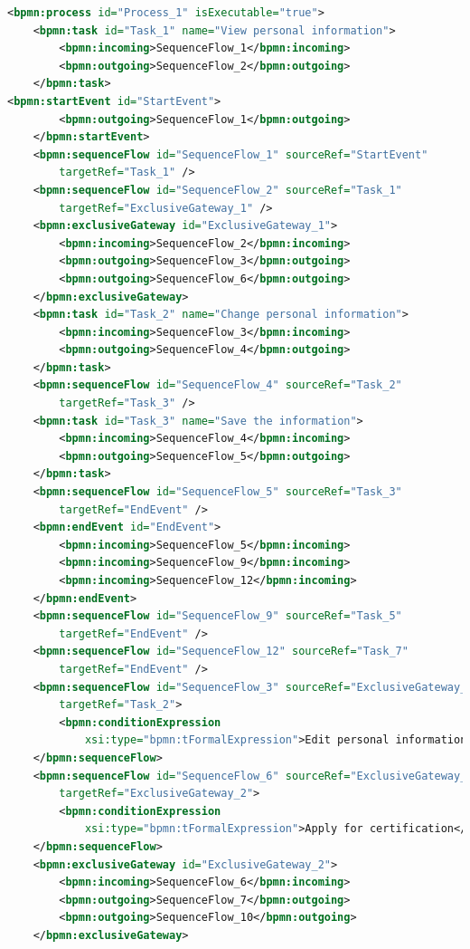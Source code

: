 \documentclass[runningheads]{llncs}
\begin{document}
   \begin{lstlisting}[language={XML}]
   <bpmn:process id="Process_1" isExecutable="true">
    <bpmn:task id="Task_1" name="View personal information">
        <bpmn:incoming>SequenceFlow_1</bpmn:incoming>
        <bpmn:outgoing>SequenceFlow_2</bpmn:outgoing>
    </bpmn:task>
<bpmn:startEvent id="StartEvent">
        <bpmn:outgoing>SequenceFlow_1</bpmn:outgoing>
    </bpmn:startEvent>
    <bpmn:sequenceFlow id="SequenceFlow_1" sourceRef="StartEvent"
        targetRef="Task_1" />
    <bpmn:sequenceFlow id="SequenceFlow_2" sourceRef="Task_1"
        targetRef="ExclusiveGateway_1" />
    <bpmn:exclusiveGateway id="ExclusiveGateway_1">
        <bpmn:incoming>SequenceFlow_2</bpmn:incoming>
        <bpmn:outgoing>SequenceFlow_3</bpmn:outgoing>
        <bpmn:outgoing>SequenceFlow_6</bpmn:outgoing>
    </bpmn:exclusiveGateway>
    <bpmn:task id="Task_2" name="Change personal information">
        <bpmn:incoming>SequenceFlow_3</bpmn:incoming>
        <bpmn:outgoing>SequenceFlow_4</bpmn:outgoing>
    </bpmn:task>
    <bpmn:sequenceFlow id="SequenceFlow_4" sourceRef="Task_2"
        targetRef="Task_3" />
    <bpmn:task id="Task_3" name="Save the information">
        <bpmn:incoming>SequenceFlow_4</bpmn:incoming>
        <bpmn:outgoing>SequenceFlow_5</bpmn:outgoing>
    </bpmn:task>
    <bpmn:sequenceFlow id="SequenceFlow_5" sourceRef="Task_3"
        targetRef="EndEvent" />
    <bpmn:endEvent id="EndEvent">
        <bpmn:incoming>SequenceFlow_5</bpmn:incoming>
        <bpmn:incoming>SequenceFlow_9</bpmn:incoming>
        <bpmn:incoming>SequenceFlow_12</bpmn:incoming>
    </bpmn:endEvent>
    <bpmn:sequenceFlow id="SequenceFlow_9" sourceRef="Task_5"
        targetRef="EndEvent" />
    <bpmn:sequenceFlow id="SequenceFlow_12" sourceRef="Task_7"
        targetRef="EndEvent" />
    <bpmn:sequenceFlow id="SequenceFlow_3" sourceRef="ExclusiveGateway_1"
        targetRef="Task_2">
        <bpmn:conditionExpression
            xsi:type="bpmn:tFormalExpression">Edit personal information</bpmn:conditionExpression>
    </bpmn:sequenceFlow>
    <bpmn:sequenceFlow id="SequenceFlow_6" sourceRef="ExclusiveGateway_1"
        targetRef="ExclusiveGateway_2">
        <bpmn:conditionExpression
            xsi:type="bpmn:tFormalExpression">Apply for certification</bpmn:conditionExpression>
    </bpmn:sequenceFlow>
    <bpmn:exclusiveGateway id="ExclusiveGateway_2">
        <bpmn:incoming>SequenceFlow_6</bpmn:incoming>
        <bpmn:outgoing>SequenceFlow_7</bpmn:outgoing>
        <bpmn:outgoing>SequenceFlow_10</bpmn:outgoing>
    </bpmn:exclusiveGateway>

\end{lstlisting}
\end{document}

